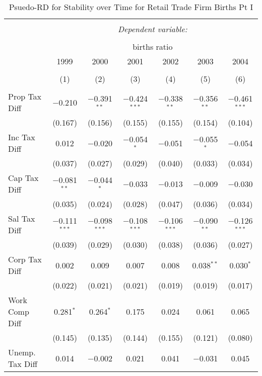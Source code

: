 
\begin{table}[!htbp] \centering 
  \caption{Psuedo-RD for Stability over Time for  Retail Trade Firm Births Pt I} 
  \label{44-45year} 
\small 
\begin{tabular}{@{\extracolsep{5pt}}lcccccc} 
\\[-1.8ex]\hline 
\hline \\[-1.8ex] 
 & \multicolumn{6}{c}{\textit{Dependent variable:}} \\ 
\cline{2-7} 
\\[-1.8ex] & \multicolumn{6}{c}{births ratio} \\ 
 & 1999 & 2000 & 2001 & 2002 & 2003 & 2004 \\ 
\\[-1.8ex] & (1) & (2) & (3) & (4) & (5) & (6)\\ 
\hline \\[-1.8ex] 
 Prop Tax Diff & $-$0.210 & $-$0.391$^{**}$ & $-$0.424$^{***}$ & $-$0.338$^{**}$ & $-$0.356$^{**}$ & $-$0.461$^{***}$ \\ 
  & (0.167) & (0.156) & (0.155) & (0.155) & (0.154) & (0.104) \\ 
  Inc Tax Diff & 0.012 & $-$0.020 & $-$0.054$^{*}$ & $-$0.051 & $-$0.055$^{*}$ & $-$0.054 \\ 
  & (0.037) & (0.027) & (0.029) & (0.040) & (0.033) & (0.034) \\ 
  Cap Tax Diff & $-$0.081$^{**}$ & $-$0.044$^{*}$ & $-$0.033 & $-$0.013 & $-$0.009 & $-$0.030 \\ 
  & (0.035) & (0.024) & (0.028) & (0.047) & (0.036) & (0.034) \\ 
  Sal Tax Diff & $-$0.111$^{***}$ & $-$0.098$^{***}$ & $-$0.108$^{***}$ & $-$0.106$^{***}$ & $-$0.090$^{**}$ & $-$0.126$^{***}$ \\ 
  & (0.039) & (0.029) & (0.030) & (0.038) & (0.036) & (0.027) \\ 
  Corp Tax Diff & 0.002 & 0.009 & 0.007 & 0.008 & 0.038$^{**}$ & 0.030$^{*}$ \\ 
  & (0.022) & (0.021) & (0.021) & (0.019) & (0.019) & (0.017) \\ 
  Work Comp Diff & 0.281$^{*}$ & 0.264$^{*}$ & 0.175 & 0.024 & 0.061 & 0.065 \\ 
  & (0.145) & (0.135) & (0.144) & (0.155) & (0.121) & (0.080) \\ 
  Unemp. Tax Diff & 0.014 & $-$0.002 & 0.021 & 0.041 & $-$0.031 & 0.045 \\ 

\end{tabular}
\end{table}

